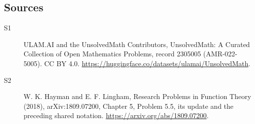 \documentclass[11pt]{article}
\begin{document}
\subsection{Sources}
\begin{description}
\item[\hypertarget{source:2305005:1}{S1}] ULAM.AI and the UnsolvedMath Contributors, UnsolvedMath: A Curated Collection of Open Mathematics Problems, record 2305005 (AMR-022-5005). CC BY 4.0. \url{https://huggingface.co/datasets/ulamai/UnsolvedMath}.
\item[\hypertarget{source:2305005:2}{S2}] W. K. Hayman and E. F. Lingham, Research Problems in Function Theory (2018), arXiv:1809.07200, Chapter 5, Problem 5.5, its update and the preceding shared notation. \url{https://arxiv.org/abs/1809.07200}.
\end{description}
\label{end:2305005}
\end{document}
